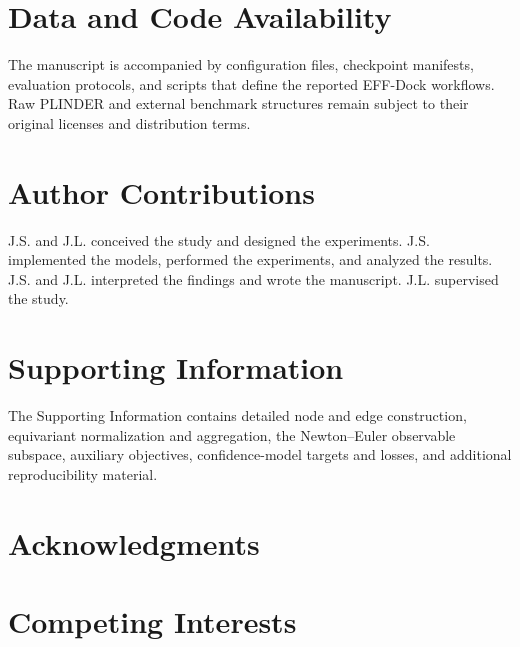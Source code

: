 \section*{Data and Code Availability}

The manuscript is accompanied by configuration files, checkpoint manifests,
evaluation protocols, and scripts that define the reported EFF-Dock
workflows. Raw PLINDER and external benchmark structures remain subject to
their original licenses and distribution terms.

\section*{Author Contributions}

J.S. and J.L. conceived the study and designed the experiments. J.S.
implemented the models, performed the experiments, and analyzed the results.
J.S. and J.L. interpreted the findings and wrote the manuscript. J.L.
supervised the study.

\section*{Supporting Information}

The Supporting Information contains detailed node and edge construction,
equivariant normalization and aggregation, the Newton--Euler observable
subspace, auxiliary objectives, confidence-model targets and losses, and
additional reproducibility material.

\section*{Acknowledgments}


\section*{Competing Interests}

